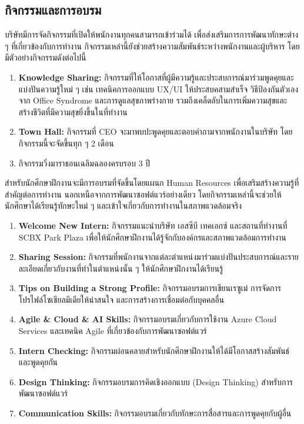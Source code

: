 \subsection{กิจกรรมและการอบรม}
บริษัทมีการจัดกิจกรรมที่เปิดให้พนักงานทุกคนสามารถเข้าร่วมได้ เพื่อส่งเสริมการการพัฒนาทักษะต่าง ๆ ที่เกี่ยวข้องกับการทำงาน กิจกรรมเหล่านี้ยังช่วยสร้างความสัมพันธ์ระหว่างพนักงานและผู้บริหาร โดยมีตัวอย่างกิจกรรมดังต่อไปนี้
\begin{enumerate}
    \item \textbf{Knowledge Sharing:} กิจกรรมที่ให้โอกาสที่ผู้มีความรู้และประสบการณ์มาร่วมพูดคุยและแบ่งปันความรู้ใหม่ ๆ เช่น เทคนิคการออกแบบ UX/UI ให้ประสบคสามสำเร็จ วิธีป้องกันตัวเองจาก Office Syndrome และการดูแลสุขภาพร่างกาย รวมถึงเคล็ดลับในการเพิ่มความสุขและสร้างชีวิตที่มีความสุขยิ่งขึ้นในที่ทำงาน
    \item \textbf{Town Hall:} กิจกรรมที่ CEO จะมาพบปะพูดคุยและตอบคำถามจากพนักงานในบริษัท โดยกิจกรรมนี้จะจัดขึ้นทุก ๆ 2 เดือน
    \item กิจกรรมวิ่งมาราธอนเฉลิมฉลองครบรอบ 3 ปี
\end{enumerate}
สำหรับนักศึกษาฝึกงานจะมีการอบรมที่จัดขึ้นโดยแผนก Human Resources เพื่อเสริมสร้างความรู้ที่สำคัญต่อการทำงาน นอกเหนือจากการพัฒนาซอฟต์แวร์อย่างเดียว โดยกิจกรรมเหล่านี้จะช่วยให้นักศึกษาได้เรียนรู้ทักษะใหม่ ๆ และเข้าใจเกี่ยวกับการทำงานในสภาพแวดล้อมจริง
\begin{enumerate}
    \item \textbf{Welcome New Intern: }กิจกรรมแนะนำบริษัท เอสซีบี เทคเอกซ์ และสถานที่ทำงานที่ SCBX Park Plaza เพื่อให้นักศึกษาฝึกงานได้รู้จักกับองค์กรและสภาพแวดล้อมการทำงาน

    \item \textbf{Sharing Session: }กิจกรรมที่พนักงานจากแต่ละตำแหน่งมาร่วมแบ่งปันประสบการณ์และรายละเอียดเกี่ยวกับงานที่ทำในตำแหน่งนั้น ๆ ให้นักศึกษาฝึกงานได้เรียนรู้
    
    \item \textbf{Tips on Building a Strong Profile: }กิจกรรมอบรมการเขียนเรซูเม่ การจัดการโปรไฟล์โซเชียลมีเดียให้น่าสนใจ และการสร้างการเชื่อมต่อกับบุคคลอื่น
    
    \item \textbf{Agile \& Cloud \& AI Skills: }กิจกรรมอบรมเกี่ยวกับการใช้งาน Azure Cloud Services และเทคนิค Agile ที่เกี่ยวข้องกับการพัฒนาซอฟต์แวร์
    
    \item \textbf{Intern Checking: }กิจกรรมผ่อนคลายสำหรับนักศึกษาฝึกงานให้ได้มีโอกาสสร้างสัมพันธ์และพูดคุยกัน
    
    \item \textbf{Design Thinking: }กิจกรรมอบรมการคิดเชิงออกแบบ (Design Thinking) สำหรับการพัฒนาซอฟต์แวร์
    
    \item \textbf{Communication Skills: }กิจกรรมอบรมเกี่ยวกับทักษะการสื่อสารและการพูดคุยกับผู้อื่น
    
\end{enumerate}


